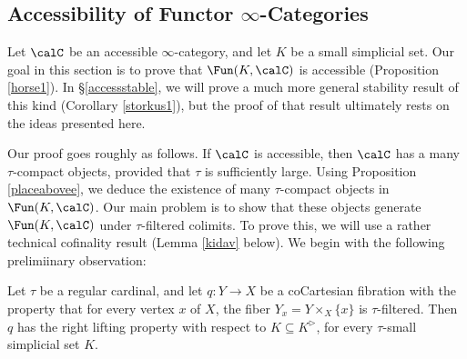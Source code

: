 
\subsection{Accessibility of Functor $\infty$-Categories}\label{accessfunk}

Let $\calC$ be an accessible $\infty$-category, and let $K$ be a small simplicial set. Our goal in this section is to prove that $\Fun(K,\calC)$ is accessible (Proposition \ref{horse1}). In \S \ref{accessstable}, we will prove a much more general stability result of this kind (Corollary \ref{storkus1}), but the proof of that result ultimately rests on the ideas presented here. 

Our proof goes roughly as follows. If $\calC$ is accessible, then $\calC$ has a many $\tau$-compact objects, provided that $\tau$ is sufficiently large. Using Proposition \ref{placeabovee}, we deduce the existence of many $\tau$-compact objects in $\Fun(K,\calC)$. Our main problem is to show that these objects generate $\Fun(K,\calC)$ under $\tau$-filtered colimits. To prove this, we will use a rather technical cofinality result (Lemma \ref{kidav} below). We begin with the following prelimiinary observation:

\begin{lemma}\label{pprekidav}
Let $\tau$ be a regular cardinal, and let $q: Y \rightarrow X$ be a coCartesian fibration with the property that for every vertex $x$ of $X$, the fiber $Y_{x} = Y \times_{X} \{x\}$ is $\tau$-filtered.
Then $q$ has the right lifting property with respect to $K \subseteq K^{\triangleright}$, for every
$\tau$-small simplicial set $K$.
\end{lemma}

